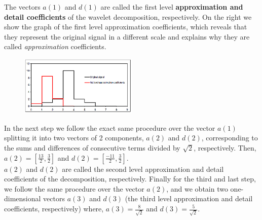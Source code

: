 The vectors $a(1)$ and $d(1)$ are called the first level \textbf{approximation and detail coefficients} of the wavelet decomposition, respectively. On the right we show the graph of the first level approximation coefficients, which reveals that they represent the original signal in a different scale and explains why they are called \emph{approximation} coefficients. \\

	\begin{figure}[H]
	   \centering
	   \includegraphics[width=0.5\textwidth]{season1/107/images/original_signal_2.png} 
	\end{figure}

In the next step we follow the exact same procedure over the vector $a(1)$ splitting it into two vectors of 2 components, $a(2)$ and $d(2)$, corresponding to the sums and differences of consecutive terms divided by $\sqrt{2}$, respectively. Then, $a(2)=\left[\frac{13}{2},\frac{3}{2}\right]$ and $d(2)=\left[\frac{-11}{2},\frac{3}{2}\right]$. \\

$a(2)$ and $d(2)$ are called the second level approximation and detail coefficients of the decomposition, respectively. Finally for the third and last step, we follow the same procedure over the vector $a(2)$, and we obtain two one-dimensional vectors $a(3)$ and $d(3)$ (the third level approximation and detail coefficients, respectively) where,  $a(3)=\frac{8}{\sqrt{2}}$ and $d(3)=\frac{5}{\sqrt{2}}$. \\

